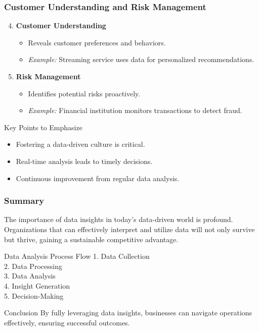 \documentclass[aspectratio=169]{beamer}
\begin{document}
\begin{frame}[fragile]
    \frametitle{Customer Understanding and Risk Management}
    \begin{enumerate}
        \setcounter{enumi}{3}
        \item \textbf{Customer Understanding}
            \begin{itemize}
                \item Reveals customer preferences and behaviors.
                \item \textit{Example:} Streaming service uses data for personalized recommendations.
            \end{itemize}
        \item \textbf{Risk Management}
            \begin{itemize}
                \item Identifies potential risks proactively.
                \item \textit{Example:} Financial institution monitors transactions to detect fraud.
            \end{itemize}
    \end{enumerate}
    \begin{block}{Key Points to Emphasize}
        \begin{itemize}
            \item Fostering a data-driven culture is critical.
            \item Real-time analysis leads to timely decisions.
            \item Continuous improvement from regular data analysis.
        \end{itemize}
    \end{block}
\end{frame}

\begin{frame}[fragile]
    \frametitle{Summary}
    The importance of data insights in today’s data-driven world is profound. Organizations that can effectively interpret and utilize data will not only survive but thrive, gaining a sustainable competitive advantage.
    
    \begin{block}{Data Analysis Process Flow}
        1. Data Collection \\
        2. Data Processing \\
        3. Data Analysis \\
        4. Insight Generation \\
        5. Decision-Making
    \end{block}
    \begin{block}{Conclusion}
        By fully leveraging data insights, businesses can navigate operations effectively, ensuring successful outcomes.
    \end{block}
\end{frame}
\end{document}
